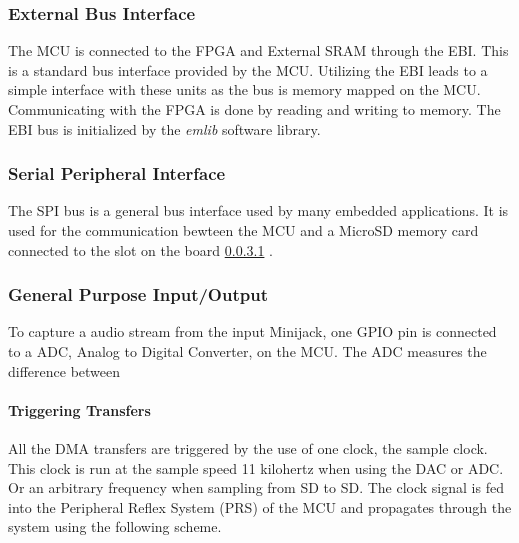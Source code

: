 \subsubsection{External Bus Interface}
The MCU is connected to the FPGA and External SRAM through the EBI. This is a standard
bus interface provided by the MCU. Utilizing the EBI leads to a
simple interface with these units as the bus is memory mapped on the MCU.
Communicating with the FPGA is done by reading and writing to memory.
The EBI bus is initialized by the {\it emlib} software library.

\subsubsection{Serial Peripheral Interface}
The SPI bus is a general bus interface used by many embedded applications. It is used
for the communication bewteen the MCU and a MicroSD memory card connected to the slot
on the board \ref{} .

\subsubsection{General Purpose Input/Output}
To capture a audio stream from the input Minijack, one GPIO pin is connected to a 
ADC, Analog to Digital Converter, on the MCU. The ADC measures the difference between



\paragraph{Triggering Transfers}

All the DMA transfers are triggered by the use of one clock, the sample clock.
This clock is run at the sample speed 11 kilohertz when using the DAC or ADC. Or
an arbitrary frequency when sampling from SD to SD. The clock signal is fed into
the Peripheral Reflex System  (PRS) of the MCU and propagates through the system
using the following scheme.

